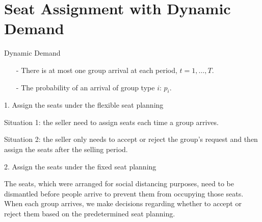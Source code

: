 
\section{Seat Assignment with Dynamic Demand}
    \frame{\sectionpage}

\begin{frame}{Dynamic Demand}
  \begin{itemize}
    \item[-] There is at most one group arrival at each period, $t = 1, \ldots, T$. 
    \item[-] The probability of an arrival of group type $i$: $p_i$.  
  \end{itemize}

  1. Assign the seats under the {\color{red}flexible seat planning}

  \begin{footnotesize}
  Situation 1: the seller need to assign seats each time a group arrives. 
  
  Situation 2: the seller only needs to accept or reject the group's request and then assign the seats after the selling period.
  \end{footnotesize}

  \vspace{0.3cm}

  2. Assign the seats under the {\color{red}fixed seat planning}

  \begin{footnotesize}
    The seats, which were arranged for social distancing purposes, need to be dismantled before people arrive to prevent them from occupying those seats. When each group arrives, we make decisions regarding whether to accept or reject them based on the predetermined seat planning.
  \end{footnotesize}
\end{frame}



